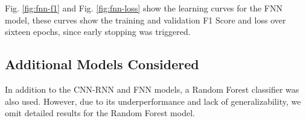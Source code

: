 Fig. \ref{fig:fnn-f1} and Fig. \ref{fig:fnn-loss} show the learning curves for the FNN model, these curves show the training and validation F1 Score and loss over sixteen epochs, since early stopping was triggered.

\subsection*{Additional Models Considered}

In addition to the CNN-RNN and FNN models, a Random Forest classifier was also used. However, due to its underperformance and lack of generalizability, we omit detailed results for the Random Forest model.